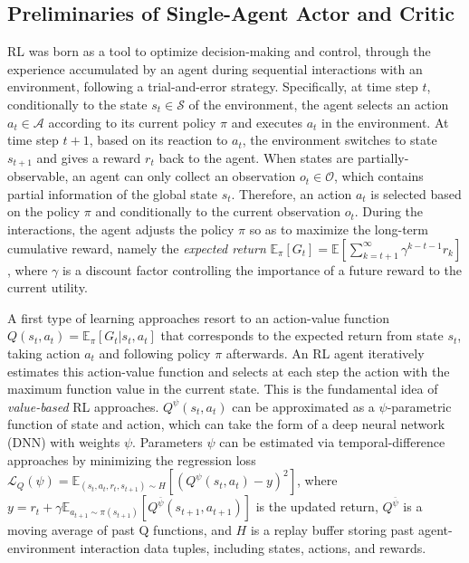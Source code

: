 \subsection{Preliminaries of Single-Agent Actor and Critic}

RL was born as a tool to optimize decision-making and control, through the experience accumulated by an agent during sequential interactions with an environment, following a trial-and-error strategy. Specifically, at time step $t$, conditionally to the state $s_t \in \mathcal{S}$ of the environment, the agent selects an action $a_t \in \mathcal{A}$ according to its current policy $\pi$ and executes $a_t$ in the environment. At time step $t+1$, based on its reaction to $a_t$, the environment switches to state $s_{t+1}$ and gives a reward $r_t$ back to the agent. When states are partially-observable, an agent can only collect an observation $o_t \in \mathcal{O}$, which contains partial information of the global state $s_t$. Therefore, an action $a_t$ is selected based on the policy $\pi$ and conditionally to the current observation $o_t$. During the interactions, the agent adjusts the policy $\pi$ so as to maximize the long-term cumulative reward, namely the \emph{expected return} $\mathbb{E}_{\pi}[G_t] = \mathbb{E}[\sum^\infty_{k=t+1}\gamma^{k-t-1}r_k]$, where $\gamma$ is a discount factor controlling the importance of a future reward to the current utility.

A first type of learning approaches resort to an action-value function $Q(s_t,a_t)=\mathbb{E}_{\pi}[G_t|s_t, a_t]$ that corresponds to the expected return from state $s_t$, taking action $a_t$ and following policy $\pi$ afterwards.
An RL agent iteratively estimates this action-value function and selects at each step the action with the maximum function value in the current state. This is the fundamental idea of \textit{value-based} RL approaches. $Q^{\psi}(s_t,a_t)$ can be approximated as a $\psi$-parametric function of state and action, which can take the form of a deep neural network (DNN) with weights $\psi$. Parameters $\psi$ can be estimated via temporal-difference approaches by minimizing the regression loss $\mathcal{L}_{Q}(\psi)=\mathbb{E}_{(s_t,a_t,r_t,s_{t+1})\sim H}[(Q^{\psi}(s_t, a_t)-y)^2]$, where $y=r_t +\gamma\mathbb{E}_{a_{t+1}\sim\pi(s_{t+1})}[Q^{\bar{\psi}}(s_{t+1},a_{t+1})]$ is the updated return, $Q^{\bar{\psi}}$ is a moving average of past Q functions, and $H$ is a replay buffer storing past agent-environment interaction data tuples, including states, actions, and rewards.

